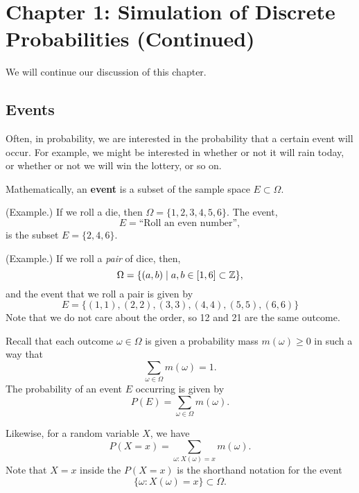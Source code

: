\documentclass[letterpaper]{article}
\begin{document}
\section{Chapter 1: Simulation of Discrete Probabilities (Continued)}
We will continue our discussion of this chapter.

\subsection{Events}
Often, in probability, we are interested in the probability that a certain event will occur. For example, we might be interested in whether or not it will rain today, or whether or not we will win the lottery, or so on. 

\bigskip 

Mathematically, an \textbf{event} is a subset of the sample space $E \subset \Omega$. 

\begin{mdframed}[]
    (Example.) If we roll a die, then $\Omega = \{1, 2, 3, 4, 5, 6\}$. The event,
    \[E = \text{``Roll an even number''},\]
    is the subset $E = \{2, 4, 6\}$. 
\end{mdframed}

\begin{mdframed}[]
    (Example.) If we roll a \emph{pair} of dice, then,
    \[\Omega = \{(a, b) \mid a, b \in [1, 6] \subset \mathbb{Z}\},\]
    and the event that we roll a pair is given by 
    \[E = \{(1, 1), (2, 2), (3, 3), (4, 4), (5, 5), (6, 6)\}\]
    Note that we do not care about the order, so 12 and 21 are the same outcome.
\end{mdframed}

Recall that each outcome $\omega \in \Omega$ is given a probability mass $m(\omega) \geq 0$ in such a way that
\[\sum_{\omega \in \Omega} m(\omega) = 1.\]
The probability of an event $E$ occurring is given by 
\[P(E) = \sum_{\omega \in \Omega} m(\omega).\]

Likewise, for a random variable $X$, we have
\[P(X = x) = \sum_{\omega: X(\omega) = x} m(\omega).\]
Note that $X = x$ inside the $P(X = x)$ is the shorthand notation for the event 
\[\{\omega: X(\omega) = x\} \subset \Omega.\]
\end{document}
